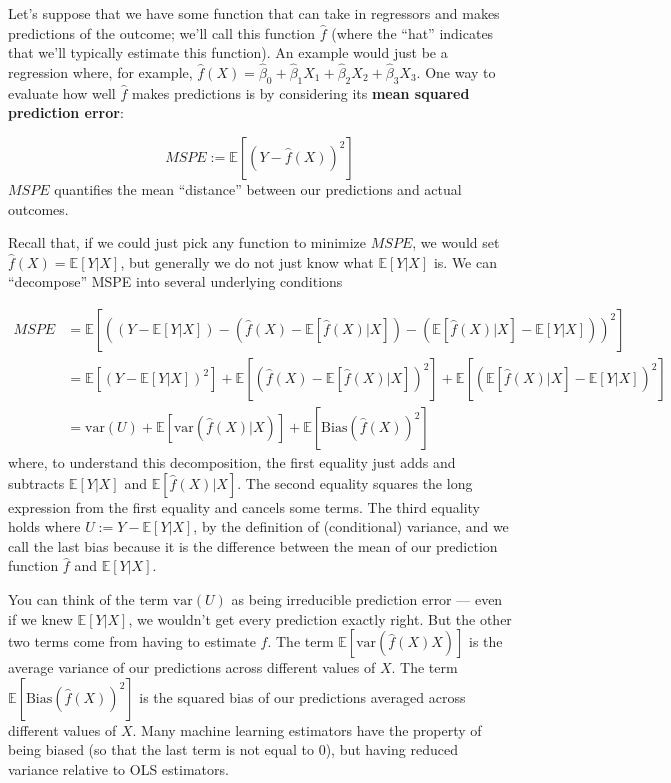 \documentclass[
  letterpaper,
  DIV=11,
  numbers=noendperiod]{scrreprt}
\begin{document}
Let's suppose that we have some function that can take in regressors and
makes predictions of the outcome; we'll call this function \(\hat{f}\)
(where the ``hat'' indicates that we'll typically estimate this
function). An example would just be a regression where, for example,
\(\hat{f}(X) = \hat{\beta}_0 + \hat{\beta}_1 X_1 + \hat{\beta}_2 X_2 + \hat{\beta}_3 X_3\).
One way to evaluate how well \(\hat{f}\) makes predictions is by
considering its \textbf{mean squared prediction error}:

\[
  MSPE := \mathbb{E}\left[ (Y - \hat{f}(X))^2 \right]
\] \(MSPE\) quantifies the mean ``distance'' between our predictions and
actual outcomes.

Recall that, if we could just pick any function to minimize \(MSPE\), we
would set \(\hat{f}(X) = \mathbb{E}[Y|X]\), but generally we do not just
know what \(\mathbb{E}[Y|X]\) is. We can ``decompose'' MSPE into several
underlying conditions

\[
  \begin{aligned}
  MSPE &= \mathbb{E}\left[ \left( (Y - \mathbb{E}[Y|X]) - (\hat{f}(X) - \mathbb{E}[\hat{f}(X)|X]) - (\mathbb{E}[\hat{f}(X)|X] - \mathbb{E}[Y|X]) \right)^2 \right] \\
  &= \mathbb{E}\left[ (Y-\mathbb{E}[Y|X])^2 \right] + \mathbb{E}\left[ (\hat{f}(X) - \mathbb{E}[\hat{f}(X)|X])^2\right] + \mathbb{E}\left[ (\mathbb{E}[\hat{f}(X)|X] - \mathbb{E}[Y|X])^2 \right] \\
  &= \mathrm{var}(U) + \mathbb{E}[\mathrm{var}(\hat{f}(X)|X)] + \mathbb{E}\left[\textrm{Bias}(\hat{f}(X))^2\right]
  \end{aligned}
\] where, to understand this decomposition, the first equality just adds
and subtracts \(\mathbb{E}[Y|X]\) and \(\mathbb{E}[\hat{f}(X)|X]\). The
second equality squares the long expression from the first equality and
cancels some terms. The third equality holds where
\(U := Y-\mathbb{E}[Y|X]\), by the definition of (conditional) variance,
and we call the last bias because it is the difference between the mean
of our prediction function \(\hat{f}\) and \(\mathbb{E}[Y|X]\).

You can think of the term \(\mathrm{var}(U)\) as being irreducible
prediction error --- even if we knew \(\mathbb{E}[Y|X]\), we wouldn't
get every prediction exactly right. But the other two terms come from
having to estimate \(\hat{f}\). The term
\(\mathbb{E}[\mathrm{var}(\hat{f}(X)X)]\) is the average variance of our
predictions across different values of \(X\). The term
\(\mathbb{E}\left[\textrm{Bias}(\hat{f}(X))^2\right]\) is the squared
bias of our predictions averaged across different values of \(X\). Many
machine learning estimators have the property of being biased (so that
the last term is not equal to 0), but having reduced variance relative
to OLS estimators.
\end{document}
